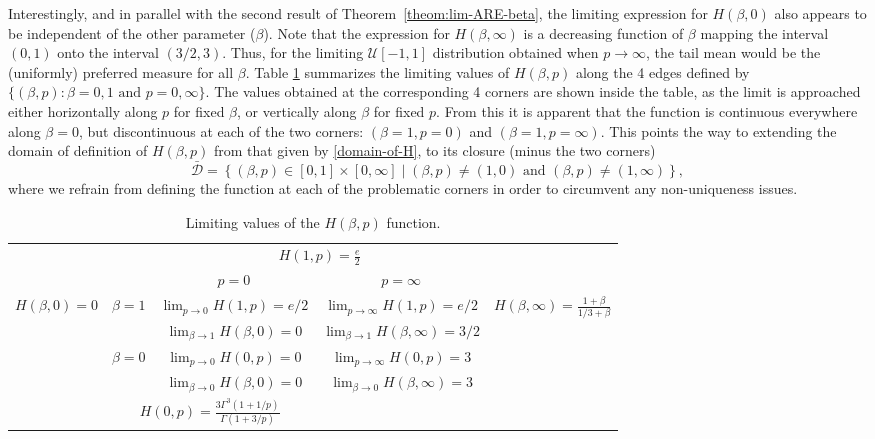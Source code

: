 \documentclass[11pt]{article}
\newcommand{\be}{\begin{equation}}
\newcommand{\ee}{\end{equation}}
\newcommand{\nc}{\normalcolor}
\begin{document}
Interestingly, and in parallel with the second result of Theorem~\ref{theom:lim-ARE-beta},
the limiting expression for $H(\beta,0)$ also appears to be independent of the
other parameter ($\beta$). Note that the expression for
$H(\beta,\infty)$ is a decreasing function of $\beta$  mapping the
interval $(0,1)$ onto the interval $(3/2,3)$. Thus, for the limiting
$\mathcal{U}[-1,1]$ distribution obtained when $p \rightarrow\infty$,
the tail mean would be the (uniformly) preferred measure for all
$\beta$.  Table \ref{tab:H-fun} summarizes the limiting values of
$H(\beta,p)$ along the 4 edges defined by $\{(\beta,p):
\beta=0,1\text{ and } p=0,\infty\}$.  The values obtained at the
corresponding 4 corners are shown inside the table, as the limit is
approached either horizontally along $p$ for fixed $\beta$, or vertically along
$\beta$ for fixed $p$. From this it is apparent that the function is continuous everywhere along
$\beta=0$, but discontinuous at each of the two corners: $(\beta=1,p=0)$
and $(\beta=1,p=\infty)$. This  points the way to
extending the domain of definition of $H(\beta,p)$ from that given by
\eqref{domain-of-H}, to its closure (minus the two corners)
\be\label{new-domain-of-H}
\bar{\mathcal{D}} = \left\{(\beta,p)\in [0,1]\times [0,\infty]\mid
  (\beta,p)\neq (1,0)\text{ and }(\beta,p)\neq (1,\infty)\right\}, 
\ee  
where we refrain from defining the
function at each of the problematic corners in order to circumvent any non-uniqueness issues. \nc

\begin{table}[tbh]
\centering
\caption{Limiting values of the $H(\beta,p)$ function.}%
\label{tab:H-fun}
\begin{tabular}{l|l|c|c|r}
\cmidrule{3-4}
\multicolumn{2}{c|}{} & \multicolumn{2}{|c|}{$H(1,p)=\frac{e}{2}$} & \\[1ex]
\cmidrule{3-4}
\multicolumn{2}{c|}{}   & $p=0$  & $p=\infty$  &  \\[1ex]
\cmidrule{2-4}
\multirow{5}{*}{$H(\beta,0)=0$} & \multirow{2}{*}{$\beta=1$} & $\lim_{p\rightarrow 0}H(1,p)=e/2$  & $\lim_{p\rightarrow\infty}H(1,p)=e/2$  & \multirow{5}{*}{$H(\beta,\infty)=\frac{1+\beta}{1/3+\beta}$}  \\[1ex]
 & & $\lim_{\beta\rightarrow 1}H(\beta,0)=0$ & $\lim_{\beta\rightarrow
   1}H(\beta,\infty)=3/2$ & \\[1ex] 
\cmidrule{2-4}
 & \multirow{2}{*}{$\beta=0$} & $\lim_{p\rightarrow 0}H(0,p)=0$  & $\lim_{p\rightarrow\infty}H(0,p)=3$  &  \\[1ex]
 & & $\lim_{\beta\rightarrow 0}H(\beta,0)=0$ & $\lim_{\beta\rightarrow
   0}H(\beta,\infty)=3$ & \\[1ex] 
\cmidrule{2-4}
\multicolumn{2}{c|}{} & \multicolumn{2}{|c|}{$H(0,p)=\frac{3\Gamma^3(1+1/p)}{\Gamma(1+3/p)}$} & \\[1ex]
\cmidrule{3-4}
\end{tabular}
\end{table}
\end{document}
